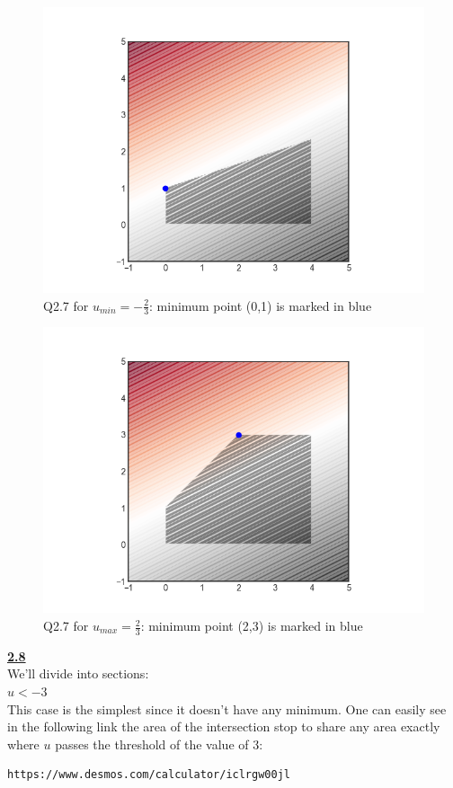 \documentclass[fleqn]{article}
\begin{document}
\begin{figure}[h!]
\includegraphics[width=0.8\linewidth]{q2_7_u_min.PNG}
\caption{Q2.7 for $u_{min}=-\frac{2}{3}$: minimum point (0,1) is marked in blue}
\end{figure}

\begin{figure}[h!]
\includegraphics[width=0.8\linewidth]{q2_7_u_max.PNG}
\caption{Q2.7 for $u_{max}=\frac{2}{3}$: minimum point (2,3) is marked in blue}
\end{figure}

\underline{\textbf{2.8}} \\

We'll divide into sections: \\

\underline{$u<-3$} \\

This case is the simplest since it doesn't have any minimum. One can easily see in the following link the area of the intersection stop to share any area exactly where $u$ passes the threshold of the value of 3: \\
\begin{lstlisting}[breaklines]
https://www.desmos.com/calculator/iclrgw00jl
\end{lstlisting}
\end{document}
